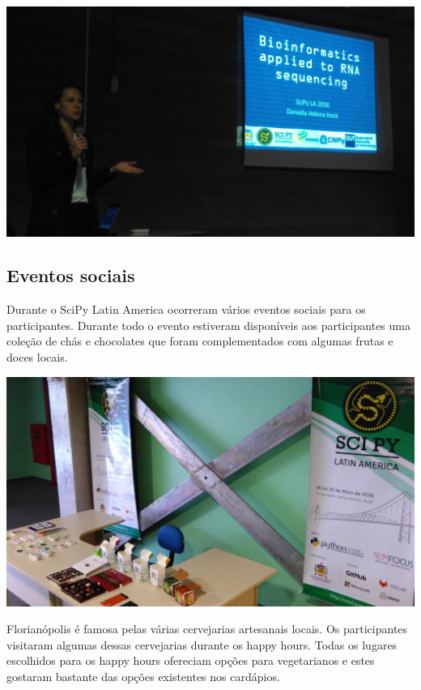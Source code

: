 \documentclass[12pt]{article}
\begin{document}
\noindent  %
\includegraphics[width=\textwidth]{talks-rna.jpg}

\subsection*{Eventos sociais}

Durante o SciPy Latin America ocorreram vários eventos sociais para os
participantes. Durante todo o evento estiveram disponíveis aos participantes uma
coleção de chás e chocolates que foram complementados com algumas frutas e doces
locais.

\noindent  %
\includegraphics[width=\textwidth]{social-break.jpg}

Florianópolis é famosa pelas várias cervejarias artesanais locais.
Os participantes visitaram algumas dessas cervejarias durante os happy hours.
Todas os lugares escolhidos para os happy hours ofereciam opções para
vegetarianos e estes gostaram bastante das opções existentes nos cardápios.
\end{document}
